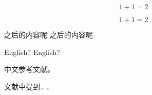 \documentclass[type=bachelor,printmode=twoside]{cquthesis}
\begin{document}
	\begin{equation}
	1 + 1 = 2
	\end{equation}
	\label{eq:dd}
	
	\begin{equation}
	1 + 1 = 2
	\end{equation}
	\label{eq:aa}
	
	
	之后的内容呢\cite{r1,z2,r2}
	之后的内容呢\cite{r3}
	
	English?
	English?
	
	中文参考文献。\cite{z2}
	
	文献中提到……
	

\end{document}
